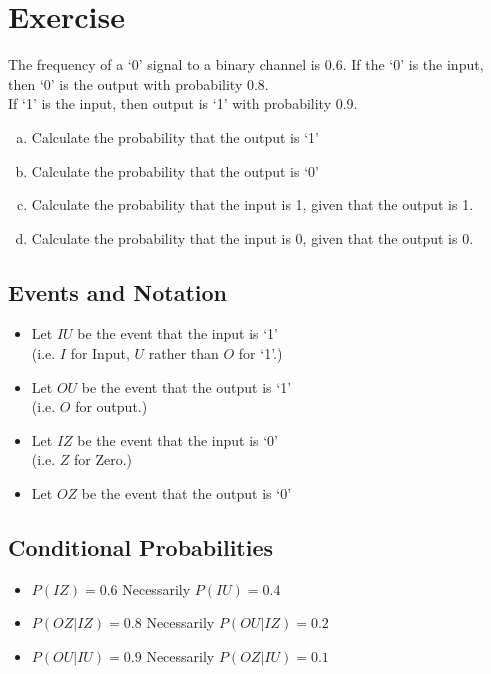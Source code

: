 \documentclass[a4paper,12pt]{article}
\begin{document}
\section*{Exercise}

\large The frequency of a `0' signal to a binary channel is 0.6. If the `0' is the input, then `0' is the output with probability 0.8.\\
\smallskip
\noindent If `1' is the input, then output is `1' with probability 0.9.

\begin{enumerate}[(a)]
\item Calculate the probability that the output is `1' 
\item Calculate the probability that the output is `0' 
\item Calculate the probability that the input is 1, given that the output is 1.
\item Calculate the probability that the input is 0, given that the output is 0.
\end{enumerate}

\medskip


\subsection*{Events and Notation}
\begin{itemize}
\item Let $IU$ be the event that the input is `1' \\(i.e. $I$ for Input, $U$ rather than $O$ for `1'.)
\item Let $OU$ be the event that the output is `1' \\(i.e. $O$ for output.)
\item Let $IZ$ be the event that the input is `0' \\(i.e. $Z$ for Zero.)
\item Let $OZ$ be the event that the output is `0'
\end{itemize}

\subsection*{Conditional Probabilities}
\begin{itemize}
\item $P(IZ) = 0.6$  Necessarily $P(IU) = 0.4$
\item $P(OZ|IZ) = 0.8$  Necessarily $P(OU|IZ) = 0.2$
\item $P(OU|IU) = 0.9$  Necessarily $P(OZ|IU) = 0.1$
\end{itemize}
\end{document}

